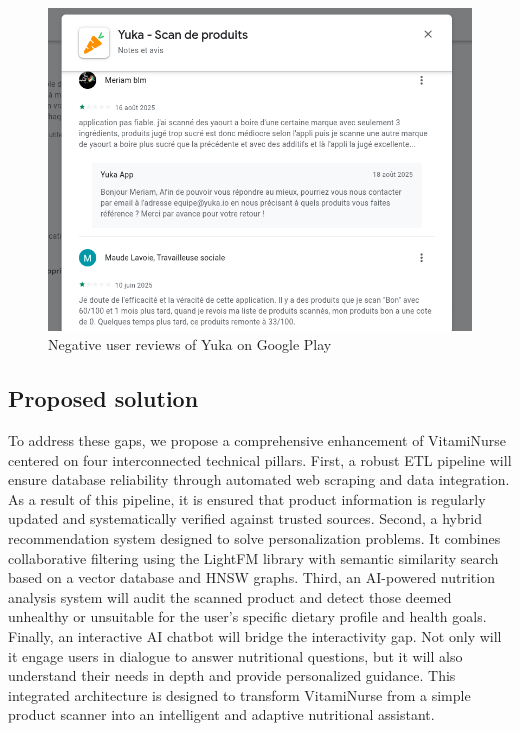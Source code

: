 \begin{center}
\begin{figure}[ht]
\includegraphics[scale=0.45]{images/yuka_negative_review.png}
\caption{Negative user reviews of Yuka on Google Play}
\label{fig:yuka_feedback}
\end{figure}
\end{center}

  
\subsection{Proposed solution}
To address these gaps, we propose a comprehensive enhancement of VitamiNurse centered on four interconnected technical pillars. First, a robust ETL pipeline will ensure database reliability through automated web scraping and data integration. As a result of this pipeline, it is ensured that product information is regularly updated and systematically verified against trusted sources.
Second, a hybrid recommendation system designed to solve personalization problems. It combines collaborative filtering using the LightFM library with semantic similarity search based on a vector database and HNSW graphs. 
 Third, an AI-powered nutrition analysis system will audit the scanned product and detect those deemed unhealthy or unsuitable for the user’s specific dietary profile and health goals.
 Finally, an interactive AI chatbot will bridge the interactivity gap. Not only will it engage users in dialogue to answer nutritional questions, but it will also understand their needs in depth and provide personalized guidance. This integrated architecture is designed to transform VitamiNurse from a simple product scanner into an intelligent and adaptive nutritional assistant.

